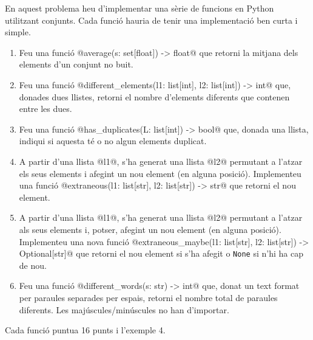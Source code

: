 

\UsePython

\Statement

En aquest problema heu d'implementar una sèrie de funcions en Python utilitzant conjunts. Cada funció hauria de tenir una implementació ben curta i simple.

\begin{enumerate}


\item Feu una funció @average(s: set[float]) -> float@ que retorni la mitjana dels elements d'un conjunt no buit.
 
\item Feu una funció @different_elements(l1: list[int], l2: list[int]) -> int@ que, donades dues llistes, retorni el nombre d'elements diferents que contenen entre les dues.
    
\item Feu una funció @has_duplicates(L: list[int]) -> bool@ que,
donada una llista, indiqui si aquesta té o no algun elements duplicat.

\item A partir d'una llista @l1@, s'ha generat una llista @l2@ permutant a l'atzar els seus elements i afegint un nou element (en alguna posició). Implementeu una funció \linebreak @extraneous(l1: list[str], l2: list[str]) -> str@ que retorni el nou element.

\item A partir d'una llista @l1@, s'ha generat una llista @l2@ permutant a l'atzar als seus elements i, potser, afegint un nou element (en alguna posició). Implementeu una nova funció @extraneous_maybe(l1: list[str], l2: list[str]) -> Optional[str]@ que retorni el nou element si s'ha afegit o \texttt{None} si n'hi ha cap de nou.

\item Feu una funció @different_words(s: str) -> int@ que, donat un text format per paraules separades per espais, retorni el nombre total de paraules diferents. Les majúscules/minúscules no han d'importar.



\end{enumerate}

\Scoring

Cada funció puntua 16 punts i l'exemple 4.

\SampleSession

